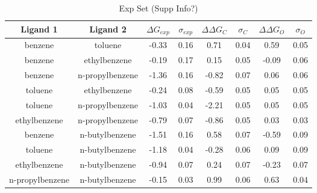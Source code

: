 \documentclass[T4paper.tex]{subfiles}
\begin{document}
\begin{table}[!htb]
\end{table}


\begin{table}[]
\centering
\caption{Exp Set (Supp Info?)}
\label{tbl:exp_set}
\begin{tabular}{|c|c|c|c|c|c|c|c|}
\hline
\textbf{Ligand 1} & \textbf{Ligand 2}  & \boldmath$\Delta G_{exp}$  & \boldmath$\sigma_{exp}$ & {\color[HTML]{800080} \boldmath$\Delta\Delta G_{C}$} & {\color[HTML]{800080} \boldmath$\sigma_{C}$} & {\color[HTML]{008000} \boldmath$\Delta\Delta G_{O}$} & {\color[HTML]{008000} \boldmath$\sigma_{O}$} \\ \hline
\cellcolor[HTML]{800080}benzene         & \cellcolor[HTML]{800080}toluene         & -0.33        & 0.16            & 0.71       & 0.04          & 0.59       & 0.05          \\ \hline
\cellcolor[HTML]{800080}benzene         & \cellcolor[HTML]{800080}ethylbenzene    & -0.19        & 0.17            & 0.15       & 0.05          & -0.09      & 0.06          \\ \hline
\cellcolor[HTML]{800080}benzene         & \cellcolor[HTML]{800080}n-propylbenzene & -1.36        & 0.16            & -0.82      & 0.07          & 0.06       & 0.06          \\ \hline
\cellcolor[HTML]{800080}toluene         & \cellcolor[HTML]{800080}ethylbenzene    & -0.24        & 0.08            & -0.59      & 0.05          & 0.05       & 0.05          \\ \hline
\cellcolor[HTML]{800080}toluene         & \cellcolor[HTML]{800080}n-propylbenzene & -1.03        & 0.04            & -2.21      & 0.05          & 0.05       & 0.05          \\ \hline
\cellcolor[HTML]{800080}ethylbenzene    & \cellcolor[HTML]{800080}n-propylbenzene & -0.79        & 0.07            & -0.86      & 0.05          & 0.03       & 0.03          \\ \hline
\cellcolor[HTML]{800080}benzene         & \cellcolor[HTML]{00FFFF}n-butylbenzene  & -1.51        & 0.16            & 0.58       & 0.07          & -0.59      & 0.09          \\ \hline
\cellcolor[HTML]{800080}toluene         & \cellcolor[HTML]{00FFFF}n-butylbenzene  & -1.18        & 0.04            & -0.28      & 0.06          & 0.09       & 0.09          \\ \hline
\cellcolor[HTML]{800080}ethylbenzene    & \cellcolor[HTML]{00FFFF}n-butylbenzene  & -0.94        & 0.07            & 0.24       & 0.07          & -0.23      & 0.07          \\ \hline
\cellcolor[HTML]{800080}n-propylbenzene & \cellcolor[HTML]{00FFFF}n-butylbenzene  & -0.15        & 0.03            & 0.99       & 0.06          & 0.63       & 0.04          \\ \hline
\end{tabular}
\end{table}
\end{document}
